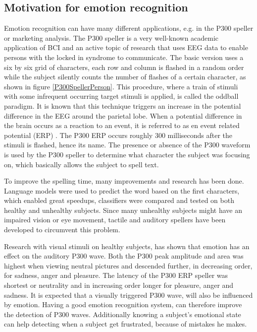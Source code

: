 
\subsection{Motivation for emotion recognition}
Emotion recognition can have many different applications, e.g. in the P300 speller or marketing analysis. The P300 speller is a very well-known academic application of BCI and an active topic of research that uses EEG data to enable persons with the locked in syndrome to communicate\cite{P300Origin}. The basic version uses a six by six grid of characters, each row and column is flashed in a random order while the subject silently counts the number of flashes of a certain character, as shown in figure \ref{P300SpellerPerson}. This procedure, where a train of stimuli with some infrequent occurring target stimuli is applied, is called the oddball paradigm\cite{PaperThibault}. It is known that this technique triggers an increase in the potential difference in the EEG around the parietal lobe. When a potential difference in the brain occurs as a reaction to an event, it is referred to as en event related potential (ERP) . The P300 ERP occurs roughly 300 milliseconds after the stimuli is flashed, hence its name\citep{ComparisonClassifications}. The presence or absence of the P300 waveform is used by the P300 speller to determine what character the subject was focusing on, which basically allows the subject to spell text. 


To improve the spelling time, many improvements and research has been done. Language models were used to predict the word based on the first characters, which enabled great speedups\cite{LangModel}, classifiers were compared and tested on both healthy\cite{ClassTechniqueComp} and unhealthy subjects\cite{ComparisonClassifications}. Since many unhealthy subjects might have an impaired vision or eye movement, tactile\cite{TactileP300} and auditory\cite{AuditoryP300} spellers have been developed to circumvent this problem.

\npar

Research with visual stimuli on healthy subjects, has shown that emotion has an effect on the auditory P300 wave\cite{AuditoryP300Effect}. Both the P300 peak amplitude and area was highest when viewing neutral pictures and descended further, in decreasing order, for sadness, anger and pleasure. The latency of the P300 ERP speller was shortest or neutrality and in increasing order longer for pleasure, anger and sadness. It is expected that a visually triggered P300 wave, will also be influenced by emotion. Having a good emotion recognition system, can therefore improve the detection of P300 waves. Additionally knowing a subject's emotional state can help detecting when a subject get frustrated, because of mistakes he makes. 

